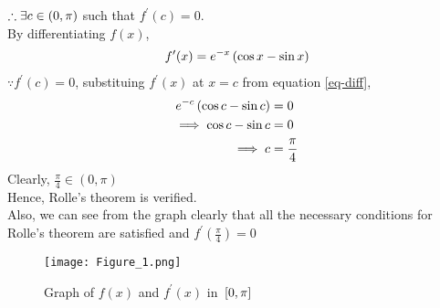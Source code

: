 \documentclass[journal,12pt,twocolumn]{IEEEtran}
\begin{document}
$\therefore \exists c \in \left(0, \pi\right)$ such that $f^\prime(c) = 0$.\\
By differentiating $f(x)$, 
\begin{align}
    \label{eq-diff}
    f^\prime (x) = e^{-x}\left(\cos x - \sin x\right)
\end{align}
$\because f^\prime(c) = 0$, substituing $f^\prime(x)$ at $x=c$ from equation \eqref{eq-diff},
\begin{align}
    e^{-c} \left(\cos c - \sin c\right) &= 0
    \\
    \implies \cos c - \sin c &= 0
    \\
    \implies c &= \frac{\pi}{4}
\end{align}
Clearly, $\frac{\pi}{4} \in (0,\pi)$\\
Hence, Rolle's theorem is verified.\\
Also, we can see from the graph clearly that all the necessary conditions for Rolle's theorem are satisfied and $f^\prime(\frac{\pi}{4}) = 0$
\begin{figure}[ht!]
	  \centering 
	  \texttt{[image: Figure\_1.png]}
	  \caption{Graph of $f(x)$ and $f^\prime(x)$ in ${}\left[0,\pi\right]$}
	  \label{fig-1}
\end{figure}
\end{document}
